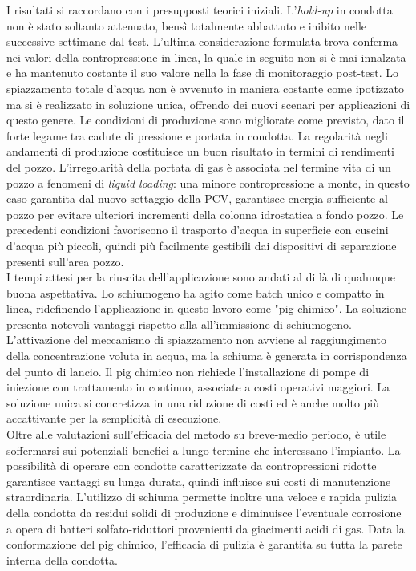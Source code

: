 I risultati si raccordano con i presupposti teorici iniziali. L'\textit{hold-up} in condotta non è stato soltanto attenuato, bensì totalmente abbattuto e inibito nelle successive settimane dal test.  L'ultima considerazione formulata trova conferma nei valori della contropressione in linea, la quale in seguito non si è mai innalzata e ha mantenuto costante il suo valore nella la fase di monitoraggio post-test. Lo spiazzamento totale d'acqua non è avvenuto in maniera costante come ipotizzato ma si è realizzato in soluzione unica, offrendo dei nuovi scenari per applicazioni di questo genere. Le condizioni di produzione sono migliorate come previsto, dato il forte legame tra cadute di pressione e portata in condotta. La regolarità negli andamenti di produzione costituisce un buon risultato in termini di rendimenti del pozzo. L'irregolarità della portata di gas è associata nel termine vita di un pozzo a fenomeni di \textit{liquid loading}: una minore contropressione a monte, in questo caso garantita dal nuovo settaggio della PCV, garantisce energia sufficiente al pozzo per evitare ulteriori incrementi della colonna idrostatica a fondo pozzo. Le precedenti condizioni favoriscono il trasporto d'acqua in superficie con cuscini d'acqua più piccoli, quindi più facilmente gestibili dai dispositivi di separazione presenti sull'area pozzo.\\
I tempi attesi per la riuscita dell'applicazione sono andati al di là di qualunque buona aspettativa. Lo schiumogeno ha agito come batch unico e compatto in linea, ridefinendo l'applicazione in questo lavoro come "pig chimico". La soluzione presenta notevoli vantaggi rispetto alla all'immissione di schiumogeno. L'attivazione del meccanismo di spiazzamento non avviene al raggiungimento della concentrazione voluta in acqua, ma la schiuma è generata in corrispondenza del punto di lancio. Il pig chimico non richiede l'installazione di pompe di iniezione con trattamento in continuo, associate a costi operativi maggiori. La soluzione unica si concretizza in una riduzione di costi ed è anche molto più accattivante per la semplicità di esecuzione.\\
Oltre alle valutazioni sull'efficacia del metodo su breve-medio periodo, è utile soffermarsi sui potenziali benefici a lungo termine che interessano l'impianto. La possibilità di operare con condotte caratterizzate da contropressioni ridotte garantisce vantaggi su lunga durata, quindi influisce sui costi di manutenzione straordinaria. L'utilizzo di schiuma permette inoltre una veloce e rapida pulizia della condotta da residui solidi di produzione e diminuisce l'eventuale corrosione a opera di batteri solfato-riduttori provenienti da giacimenti acidi di gas. Data la conformazione del pig chimico, l'efficacia di pulizia è garantita su tutta la parete interna della condotta.\\
